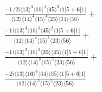 \documentclass[varwidth, border=5pt]{standalone}
\begin{document}
\begin{my}
$\begin{gathered}
\scriptscriptstyle\frac{-1/2i\langle13\rangle^4\langle16\rangle^3\langle45\rangle^3\langle1|5+6|1]}{\langle12\rangle\langle14\rangle^4\langle15\rangle^4\langle23\rangle\langle34\rangle\langle56\rangle}+\\
\scriptscriptstyle\frac{-1i\langle13\rangle^3\langle16\rangle^3\langle45\rangle^2\langle1|5+6|1]}{\langle12\rangle\langle14\rangle^4\langle15\rangle^3\langle23\rangle\langle56\rangle}+\\
\scriptscriptstyle\frac{-1i\langle13\rangle^2\langle16\rangle^3\langle35\rangle\langle45\rangle\langle1|5+6|1]}{\langle12\rangle\langle14\rangle^3\langle15\rangle^3\langle23\rangle\langle56\rangle}+\\
\scriptscriptstyle\frac{-2i\langle13\rangle\langle16\rangle^3\langle34\rangle\langle35\rangle\langle1|5+6|1]}{\langle12\rangle\langle14\rangle^3\langle15\rangle^2\langle23\rangle\langle56\rangle}\phantom{+}
\end{gathered}$
\end{my}
\end{document}
